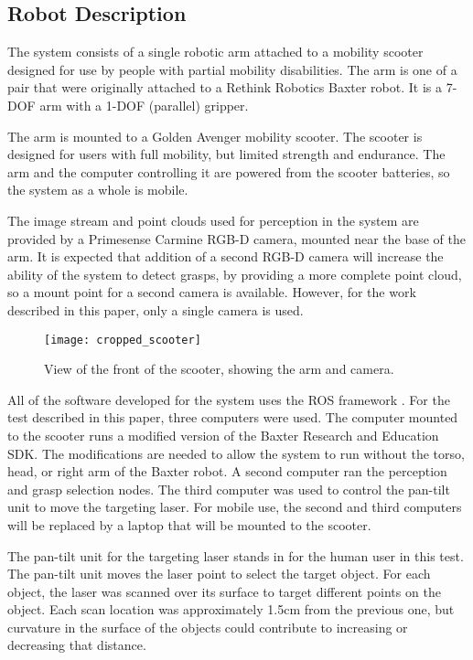 \documentclass[letterpaper, 10 pt, conference]{ieeeconf}
\begin{document}
 
\subsection{Robot Description}

The system consists of a single robotic arm attached to a mobility scooter designed for use by people with partial mobility disabilities. 
The arm is one of a pair that were originally attached to a Rethink Robotics Baxter robot. 
It is a 7-DOF arm with a 1-DOF (parallel) gripper. 

The arm is mounted to a Golden Avenger mobility scooter. The scooter is designed for users with full mobility, but limited strength and endurance. 
The arm and the computer controlling it are powered from the scooter batteries, so the system as a whole is mobile. 

The image stream and point clouds used for perception in the system are provided by a Primesense Carmine RGB-D camera, mounted near the base of the arm. It is expected that addition of a second RGB-D camera will increase the ability of the system to detect grasps, by providing a more complete point cloud, so a mount point for a second camera is available. 
However, for the work described in this paper, only a single camera is used. 
 
\begin{figure}
    \centering
    \texttt{[image: cropped\_scooter]}
    \caption{View of the front of the scooter, showing the arm and camera.}
    \label{img:scooter}
\end{figure}

All of the software developed for the system uses the ROS framework \cite{ros_quigley}. 
For the test described in this paper, three computers were used. 
The computer mounted to the scooter runs a modified version of the Baxter Research and Education SDK. 
The modifications are needed to allow the system to run without the torso, head, or right arm of the Baxter robot. 
A second computer ran the perception and grasp selection nodes.
The third computer was used to control the pan-tilt unit to move the targeting laser. 
For mobile use, the second and third computers will be replaced by a laptop that will be mounted to the scooter. 

The pan-tilt unit for the targeting laser stands in for the human user in this test. 
The pan-tilt unit moves the laser point to select the target object.
For each object, the laser was scanned over its surface to target different points on the object.
Each scan location was approximately 1.5cm from the previous one, but curvature in the surface of the objects could contribute to increasing or decreasing that distance. 
\end{document}
